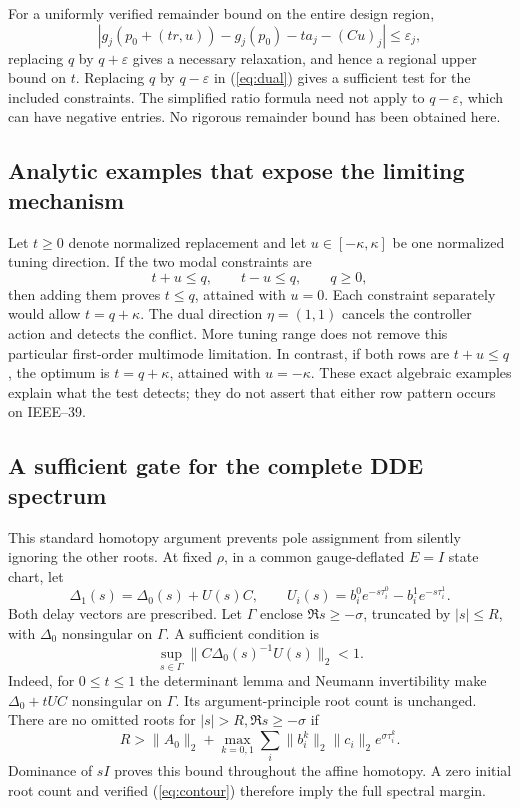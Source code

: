 \documentclass[11pt]{article}
\begin{document}
For a uniformly verified remainder bound on the entire design region,
\[
 |g_j(p_0+(tr,u))-g_j(p_0)-t a_j-(Cu)_j|\le\varepsilon_j ,
\]
replacing $q$ by $q+\varepsilon$ gives a necessary relaxation,
and hence a regional upper bound on $t$.
Replacing $q$ by $q-\varepsilon$ in (\ref{eq:dual}) gives a
sufficient test for the included constraints. The simplified
ratio formula need not apply to $q-\varepsilon$, which can have
negative entries. No rigorous remainder bound has been obtained here.

\subsection{Analytic examples that expose the limiting mechanism}
Let $t\ge0$ denote normalized replacement and let $u\in[-\kappa,\kappa]$
be one normalized tuning direction. If the two modal constraints are
\[
 t+u\le q,\qquad t-u\le q,\qquad q\ge0,
\]
then adding them proves $t\le q$, attained with $u=0$.
Each constraint separately would allow $t=q+\kappa$.
The dual direction $\eta=(1,1)$ cancels the controller action and
detects the conflict. More tuning range does not remove this
particular first-order multimode limitation.
In contrast, if both rows are $t+u\le q$, the optimum is
$t=q+\kappa$, attained with $u=-\kappa$.
These exact algebraic examples explain what the test detects;
they do not assert that either row pattern occurs on IEEE--39.

\subsection{A sufficient gate for the complete DDE spectrum}
This standard homotopy argument prevents pole assignment from
silently ignoring the other roots. At fixed $\rho$, in a common
gauge-deflated $E=I$ state chart, let
\[
 \Delta_1(s)=\Delta_0(s)+U(s)C,\qquad
 U_i(s)=b_i^0e^{-s\tau_i^0}-b_i^1e^{-s\tau_i^1}.
\]
Both delay vectors are prescribed.
Let $\Gamma$ enclose $\Re s\ge-\sigma$, truncated by $|s|\le R$,
with $\Delta_0$ nonsingular on $\Gamma$. A sufficient condition is
\begin{equation}
 \sup_{s\in\Gamma}\|C\Delta_0(s)^{-1}U(s)\|_2<1 . \label{eq:contour}
\end{equation}
Indeed, for $0\le t\le1$ the determinant lemma and Neumann
invertibility make $\Delta_0+tUC$ nonsingular on $\Gamma$.
Its argument-principle root count is unchanged.
There are no omitted roots for $|s|>R,\Re s\ge-\sigma$ if
\[
 R>\|A_0\|_2+
 \max_{k=0,1}\sum_i\|b_i^k\|_2\|c_i\|_2e^{\sigma\tau_i^k}.
\]
Dominance of $sI$ proves this bound throughout the affine homotopy.
A zero initial root count and verified (\ref{eq:contour}) therefore
imply the full spectral margin.
\end{document}
